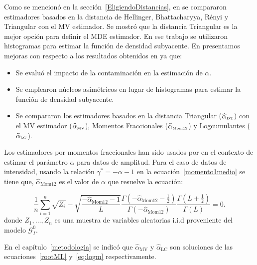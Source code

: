 Como se mencionó en la sección~\ref{EligiendoDistancias}, en \citet{APSAR2013ParameterEstimationStochasticDistances} se compararon estimadores basados en la distancia de Hellinger, Bhattacharyya, Rényi y Triangular con el MV estimador. Se mostró que la distancia Triangular es la mejor opción para definir el MDE estimador. En ese trabajo se utilizaron histogramas para estimar la función de densidad subyacente. En \citet{gambini2015} %
presentamos mejoras con respecto a los resultados obtenidos en \citet{APSAR2013ParameterEstimationStochasticDistances} ya que: 
\begin{itemize}
	\item Se evaluó el impacto de la contaminación en la estimación de $\alpha$.
	\item Se emplearon núcleos asimétricos en lugar de histogramas para estimar la función de densidad subyacente.
	\item Se compararon los estimadores basados en la distancia Triangular ($\widehat{\alpha}_{\text{\tiny{DT}}}$) con el MV estimador ($\widehat{\alpha}_{\text{\tiny{MV}}}$), Momentos Fraccionales ($\widehat{\alpha}_{\text{\tiny{Mom12}}}$) y Logcumulantes ($\widehat{\alpha}_{\text{\tiny{LC}}}$). 
\end{itemize}

Los estimadores por momentos fraccionales han sido usados por \citet{Frery97,GambiniSC08} en el contexto de estimar el parámetro $\alpha$ para datos de amplitud. Para el caso de datos de intensidad, usando la relación $\gamma^*=-\alpha-1$ en la ecuación~\eqref{momento1medio} se tiene que, $\widehat{\alpha}_\text{Mom12}$ es el valor de $\alpha$ que resuelve la ecuación:

\begin{equation}
\frac{1}{n} \sum_{i=1}^n \sqrt{Z_i} -\sqrt{\frac{-\widehat\alpha_{\text{Mom12}}-1}{L}}\frac{\Gamma ( -\widehat\alpha_{\text{Mom12}}-{\frac{1}{2}} )}{ \Gamma (-\widehat\alpha_{\text{Mom12}}) }
\frac{\Gamma (L+{\frac{1}{2}} )}{\Gamma (L)}=0.
\label{estim_moment1_2_gI0}
\end{equation}
donde $Z_1,\ldots,Z_n$ es una muestra de variables aleatorias i.i.d proveniente del modelo $\mathcal{G}_I^0$.

En el capítulo~\ref{metodologia} se indicó que $\widehat{\alpha}_\text{MV}$ y $\widehat{\alpha}_\text{LC}$ son soluciones de las ecuaciones~\eqref{rootML} y~\eqref{eq:logm} respectivamente.

